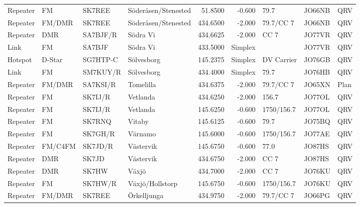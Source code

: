 {\begin{landscape}
\begin{longtable}{llllrrlll}
	Repeater          & FM              & SK7REE   & Söderåsen/Stenested  &      51.8500 &     -0.600 & 79.7              & JO66NB      & QRV      \\
	Repeater          & FM/DMR          & SK7REE   & Söderåsen/Stenested  &     434.6500 &     -2.000 & 79.7/CC 7         & JO66NB      & QRV      \\
	Repeater          & DMR             & SA7BJF/R & Södra Vi             &     434.6625 &     -2.000 & CC 7              & JO77VR      & QRV      \\
	Link              & FM              & SA7BJF   & Södra Vi             &     433.5000 &    Simplex &                   & JO77VR      & QRV      \\
	Hotspot           & D-Star          & SG7HTP-C & Sölvesborg           &     145.2375 &    Simplex & DV Carrier        & JO76GB      & QRV      \\
	Link              & FM              & SM7KUY/R & Sölvesborg           &     434.4000 &    Simplex & 79.7              & JO76HB      & QRV      \\
	Repeater          & FM/DMR          & SA7KSI/R & Tomelilla            &     434.6375 &     -2.000 & 79.7/CC 7         & JO65XN      & Plan     \\
	Repeater          & FM              & SK7IJ/R  & Vetlanda             &     434.6250 &     -2.000 & 156.7             & JO77OL      & QRV      \\
	Repeater          & FM              & SK7IJ/R  & Vetlanda             &     145.6250 &     -0.600 & 1750/156.7        & JO77OL      & QRV      \\
	Repeater          & FM              & SK7RNQ   & Vitaby               &     145.6125 &     -0.600 & 79.7              & JO75BQ      & QRV      \\
	Repeater          & FM              & SK7GH/R  & Värnamo              &     145.6000 &     -0.600 & 1750/156.7        & JO77AE      & QRV      \\
	Repeater          & FM/C4FM         & SK7JD/R  & Västervik            &     145.6750 &     -0.600 & 77.0              & JO87HS      & QRV      \\
	Repeater          & DMR             & SK7JD    & Västervik            &     434.6750 &     -2.000 & CC 7              & JO87HS      & QRV      \\
	Repeater          & DMR             & SK7HW    & Växjö                &     434.7000 &     -2.000 & CC 7              & JO76KU      & QRV      \\
	Repeater          & FM              & SK7HW/R  & Växjö/Hollstorp      &     145.6750 &     -0.600 & 1750/156.7        & JO76KU      & QRV      \\
	Repeater          & FM/DMR          & SK7REE   & Örkelljunga          &     434.9750 &     -2.000 & 79.7/CC 7         & JO66PG      & QRV
\end{longtable}



\end{landscape}}

